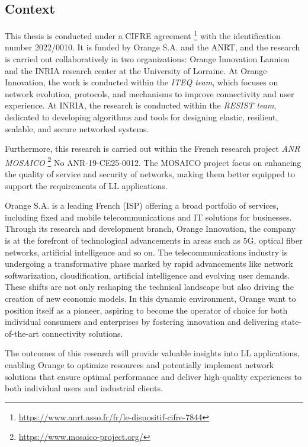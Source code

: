 \subsection*{Context}
This thesis is conducted under a \ac{CIFRE} agreement \footnote{\url{https://www.anrt.asso.fr/fr/le-dispositif-cifre-7844}} with the identification number 2022/0010. It is funded by Orange S.A. and the \ac{ANRT}, and the research is carried out collaboratively in two organizations: Orange Innovation Lannion and the INRIA research center at the University of Lorraine. At Orange Innovation, the work is conducted within the \textit{ITEQ team}, which focuses on network evolution, protocols, and mechanisms to improve connectivity and user experience. At INRIA, the research is conducted within the \textit{RESIST team}, dedicated to developing algorithms and tools for designing elastic, resilient, scalable, and secure networked systems.

Furthermore, this research is carried out within the French research project \textit{ANR MOSAICO} \footnote{\url{https://www.mosaico-project.org/}} No ANR-19-CE25-0012. The MOSAICO project focus on enhancing the quality of service and security of networks, making them better equipped to support the requirements of \ac{LL} applications. 

Orange S.A. is a leading French (\ac{ISP}) offering a broad portfolio of services, including fixed and mobile telecommunications and IT solutions for businesses. Through its research and development branch, Orange Innovation, the company is at the forefront of technological advancements in areas such as 5G, optical fiber networks, artificial intelligence and so on. The telecommunications industry is undergoing a transformative phase marked by rapid advancements like network softwarization, cloudification, artificial intelligence and evolving user demands. These shifts are not only reshaping the technical landscape but also driving the creation of new economic models. In this dynamic environment, Orange want to position itself as a pioneer, aspiring to become the operator of choice for both individual consumers and enterprises by fostering innovation and delivering state-of-the-art connectivity solutions.


The outcomes of this research will provide valuable insights into \ac{LL} applications, enabling Orange to optimize resources and potentially implement network solutions that ensure optimal performance and deliver high-quality experiences to both individual users and industrial clients.

